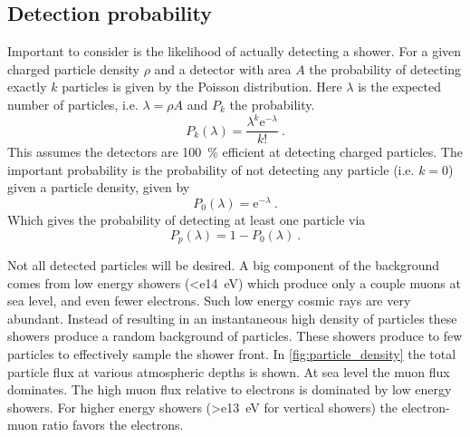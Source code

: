\subsection{Detection probability}
\label{ssec:detection_probability}

Important to consider is the likelihood of actually detecting a shower. For a given charged particle density $\rho$ and a detector with area $A$ the probability of detecting exactly $k$ particles is given by the Poisson distribution. Here $\lambda$ is the expected number of particles, i.e. $\lambda = \rho A$ and $P_k$ the probability.
%
\begin{equation}
    \label{eq:poisson}
    P_k(\lambda) = \frac{\lambda^k \mathrm{e}^{-\lambda}}{k!} \ .
\end{equation}
%
This assumes the detectors are \SI{100}{\percent} efficient at detecting charged particles. The important probability is the probability of not detecting any particle (i.e. $k = 0$) given a particle density, given by
%
\begin{equation}
    P_0(\lambda) = \mathrm{e}^{-\lambda} \ .
\end{equation}
%
Which gives the probability of detecting at least one particle via
%
\begin{equation}
    P_p(\lambda) = 1-P_0(\lambda) \ .
\end{equation}

Not all detected particles will be desired. A big component of the background comes from low energy showers (\SI{<e14}{\eV}) which produce only a couple muons at sea level, and even fewer electrons. Such low energy cosmic rays are very abundant. Instead of resulting in an instantaneous high density of particles these showers produce a random background of particles. These showers produce to few particles to effectively sample the shower front. In \cref{fig:particle_density} the total particle flux at various atmospheric depths is shown. At sea level the muon flux dominates. The high muon flux relative to electrons is dominated by low energy showers. For higher energy showers (\SI{>e13}{\eV} for vertical showers) the electron-muon ratio favors the electrons.

